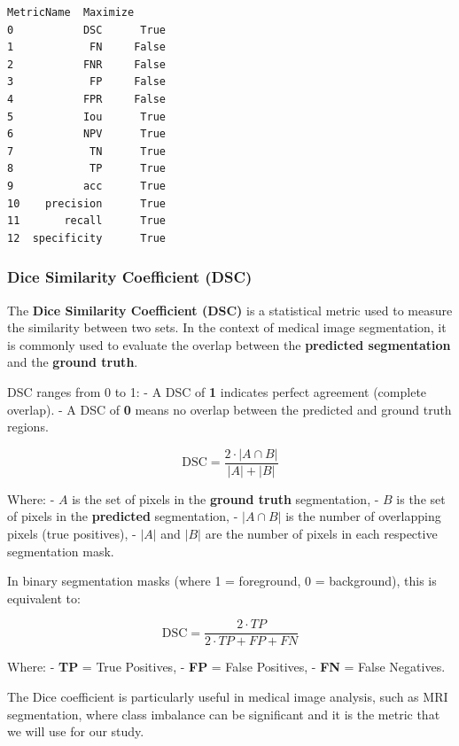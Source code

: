 \documentclass[11pt]{article}
\makeatletter
\newcommand{\boxspacing}{\kern\kvtcb@left@rule\kern\kvtcb@boxsep}
\newcommand{\prompt}[4]{
        {\ttfamily\llap{{\color{#2}[#3]:\hspace{3pt}#4}}\vspace{-\baselineskip}}
    }
\makeatother
\begin{document}
            \begin{tcolorbox}[breakable, size=fbox, boxrule=.5pt, pad at break*=1mm, opacityfill=0]
\prompt{Out}{outcolor}{ }{\boxspacing}
\begin{Verbatim}[commandchars=\\\{\}]
     MetricName  Maximize
0           DSC      True
1            FN     False
2           FNR     False
3            FP     False
4           FPR     False
5           Iou      True
6           NPV      True
7            TN      True
8            TP      True
9           acc      True
10    precision      True
11       recall      True
12  specificity      True
\end{Verbatim}
\end{tcolorbox}
        
    \subsubsection{Dice Similarity Coefficient
(DSC)}\label{dice-similarity-coefficient-dsc}

The \textbf{Dice Similarity Coefficient (DSC)} is a statistical metric
used to measure the similarity between two sets. In the context of
medical image segmentation, it is commonly used to evaluate the overlap
between the \textbf{predicted segmentation} and the \textbf{ground
truth}.

DSC ranges from 0 to 1: - A DSC of \textbf{1} indicates perfect
agreement (complete overlap). - A DSC of \textbf{0} means no overlap
between the predicted and ground truth regions.

\[
\text{DSC} = \frac{2 \cdot |A \cap B|}{|A| + |B|}
\]

Where: - \(A\) is the set of pixels in the \textbf{ground truth}
segmentation, - \(B\) is the set of pixels in the \textbf{predicted}
segmentation, - \(|A \cap B|\) is the number of overlapping pixels (true
positives), - \(|A|\) and \(|B|\) are the number of pixels in each
respective segmentation mask.

In binary segmentation masks (where 1 = foreground, 0 = background),
this is equivalent to:

\[
\text{DSC} = \frac{2 \cdot TP}{2 \cdot TP + FP + FN}
\]

Where: - \textbf{TP} = True Positives, - \textbf{FP} = False Positives,
- \textbf{FN} = False Negatives.

The Dice coefficient is particularly useful in medical image analysis,
such as MRI segmentation, where class imbalance can be significant and
it is the metric that we will use for our study.
\end{document}
